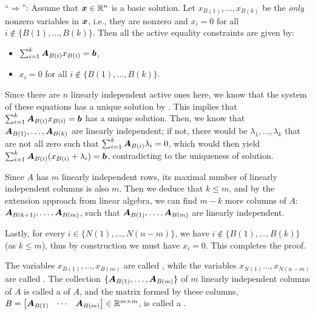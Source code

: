 \begin{enumerate}
\begin{pf}
``\(\Rightarrow\)'': Assume that \(\bm{x}\in\mathbb{R}^n\) is a basic solution. Let
\(x_{B(1)},\dotsc,x_{B(k)}\) be the \emph{only} nonzero variables in
\(\bm{x}\), i.e., they are nonzero and \(x_i=0\) for all
\(i\notin\{B(1),\dotsc,B(k)\}\). Then all the active equality constraints are
given by:
\begin{itemize}
\item \(\sum_{i=1}^{k}\bm{A}_{B(i)}x_{B(i)}=\bm{b}\),
\item \(x_i=0\) for all \(i\notin\{B(1),\dotsc,B(k)\}\).
\end{itemize}
Since there are \(n\) linearly independent active ones here, we know that the
system of these equations has a unique solution by
. This implies that
\(\sum_{i=1}^{k}\bm{A}_{B(i)}x_{B(i)}=\bm{b}\) has a unique solution.
Then, we know that \(\bm{A}_{B(1)},\dotsc,\bm{A}_{B(k)}\) are linearly
independent; if not, there would be \(\lambda_1,\dotsc,\lambda_k\) that are not all
zero such that \(\sum_{i=1}^{k}\bm{A}_{B(i)}\lambda_i=0\), which would then
yield \(\sum_{i=1}^{k}\bm{A}_{B(i)}(x_{B(i)}+\lambda_i)=\bm{b}\),
contradicting to the uniqueness of solution.

Since \(A\) has \(m\) linearly independent rows, its maximal number of linearly
independent columns is also \(m\). Then we deduce that \(k\le m\), and by the
extension approach from linear algebra, we can find \(m-k\) more columns of
\(A\): \(\bm{A}_{B(k+1)},\dotsc,\bm{A}_{B(m)}\), such that
\(\bm{A}_{B(1)},\dotsc,\bm{A}_{B(m)}\) are linearly independent.

Lastly, for every \(i\in\{N(1),\dotsc,N(n-m)\}\), we have
\(i\notin\{B(1),\dotsc,B(k)\}\) (as \(k\le m\)), thus by construction we must
have \(x_i=0\). This completes the proof.
\end{pf}

\begin{remark}
\item The variables \(x_{B(1)},\dotsc,x_{B(m)}\) are called , while the variables \(x_{N(1)}\dotsc,x_{N(n-m)}\) are called
. The collection
\(\{\bm{A}_{B(1)},\dotsc,\bm{A}_{B(m)}\}\) of \(m\) linearly independent
columns of \(A\) is called a  of \(A\), and the matrix formed by these
columns,
\(B=\begin{bmatrix}\bm{A}_{B(1)}&\cdots&\bm{A}_{B(m)}\end{bmatrix}\in\mathbb{R}^{m\times
m}\), is called a .


\end{remark}
\end{enumerate}
